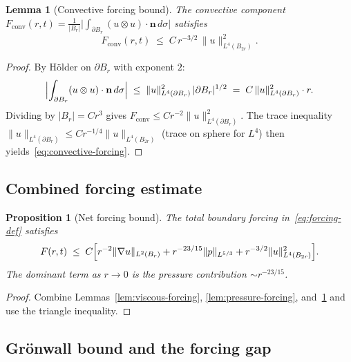 \documentclass[11pt]{article}
\newtheorem{proposition}[theorem]{Proposition}
\newtheorem{lemma}[theorem]{Lemma}
\theoremstyle{definition}
\theoremstyle{remark}
\begin{document}
\begin{lemma}[Convective forcing bound]\label{lem:convective-forcing}
  The convective component
  $F_{\mathrm{conv}}(r,t) = \tfrac{1}{|B_r|}\bigl|\int_{\partial B_r}(u\otimes u)\cdot\mathbf{n}\,d\sigma\bigr|$
  satisfies
  \begin{equation}\label{eq:convective-forcing}
    F_{\mathrm{conv}}(r,t) \;\leq\; C\,r^{-3/2}\,\|u\|_{L^{4}(B_{2r})}^2.
  \end{equation}
\end{lemma}
\begin{proof}
By H\"{o}lder on $\partial B_r$ with exponent $2$:
\[
  \Bigl|\int_{\partial B_r}(u\otimes u)\cdot\mathbf{n}\,d\sigma\Bigr|
  \;\leq\; \|u\|_{L^4(\partial B_r)}^2\,|\partial B_r|^{1/2}
  \;=\; C\,\|u\|_{L^4(\partial B_r)}^2\cdot r.
\]
Dividing by $|B_r| = Cr^3$ gives $F_{\mathrm{conv}} \leq Cr^{-2}\|u\|_{L^4(\partial B_r)}^2$.
The trace inequality $\|u\|_{L^4(\partial B_r)} \leq Cr^{-1/4}\|u\|_{L^4(B_{2r})}$
(trace on sphere for $L^4$) then yields~\eqref{eq:convective-forcing}.
\end{proof}

\subsection{Combined forcing estimate}

\begin{proposition}[Net forcing bound]\label{prop:net-forcing}
  The total boundary forcing in~\eqref{eq:forcing-def} satisfies
  \begin{equation}\label{eq:net-forcing}
    F(r,t) \;\leq\; C\Bigl[
      r^{-2}\|\nabla u\|_{L^{2}(B_r)}
      + r^{-23/15}\|p\|_{L^{5/3}}
      + r^{-3/2}\|u\|_{L^4(B_{2r})}^2
    \Bigr].
  \end{equation}
  The dominant term as $r\to 0$ is the pressure contribution $\sim r^{-23/15}$.
\end{proposition}
\begin{proof}
Combine Lemmas~\ref{lem:viscous-forcing}, \ref{lem:pressure-forcing},
and~\ref{lem:convective-forcing} and use the triangle inequality.
\end{proof}

\subsection{Gr\"{o}nwall bound and the forcing gap}
\end{document}
